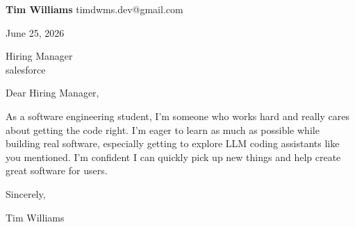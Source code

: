 \documentclass[12pt]{article}
\begin{document}
\textbf{Tim Williams} \hfill timdwms.dev@gmail.com

\vspace{1em}

June 25, 2026

\vspace{1em}

Hiring Manager \\
salesforce

\vspace{1em}

Dear Hiring Manager,

As a software engineering student, I’m someone who works hard and really cares about getting the code right. I’m eager to learn as much as possible while building real software, especially getting to explore LLM coding assistants like you mentioned. I’m confident I can quickly pick up new things and help create great software for users.

\vspace{1em}

Sincerely,

\vspace{2em}

Tim Williams
\end{document}

